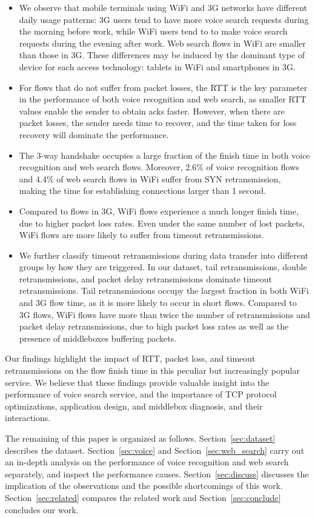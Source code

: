 \begin{itemize}
\item We observe that mobile terminals using WiFi and 3G networks have different daily usage patterns: 3G users tend to have more voice search requests during the morning before work, while WiFi users tend to to make voice search requests during the evening after work. Web search flows in WiFi are smaller than those in 3G. These differences may be induced by the dominant type of device for each access technology: tablets in WiFi and smartphones in 3G.
\item For flows that do not suffer from packet losses, the RTT is the key parameter in the performance of both voice recognition and web search, as smaller RTT values enable the sender to obtain acks faster. However, when there are packet losses, the sender needs time to recover, and the time taken for loss recovery will dominate the performance.
\item The 3-way handshake occupies a large fraction of the finish time in both voice recognition and web search flows. Moreover, 2.6\% of voice recognition flows and 4.4\% of web search flows in WiFi suffer from SYN retransmission, making the time for establishing connections larger than 1 second.
\item Compared to flows in 3G, WiFi flows experience a much longer finish time, due to higher packet loss rates. Even under the same number of lost packets, WiFi flows are more likely to suffer from timeout retransmissions.
\item We further classify timeout retransmissions during data transfer into different groups by how they are triggered. In our dataset, tail retransmissions, double retransmissions, and packet delay retransmissions dominate timeout retransmissions. Tail retransmissions occupy the largest fraction in both WiFi and 3G flow time, as it is more likely to occur in short flows. Compared to 3G flows, WiFi flows have more than twice the number of retransmissions and packet delay retransmissions, due to high packet loss rates as well as the presence of middleboxes buffering packets.
\end{itemize}

Our findings highlight the impact of RTT, packet loss, and timeout retransmissions on the flow finish time in this peculiar but increasingly popular service. We believe that these findings provide valuable insight into the performance of voice search service, and the importance of TCP protocol optimizations, application design, and middlebox diagnosis, and their interactions.

The remaining of this paper is organized as follows. Section~\ref{sec:dataset} describes the dataset. Section~\ref{sec:voice} and Section~\ref{sec:web_search} carry out an in-depth analysis on the performance of voice recognition and web search separately, and inspect the performance causes. Section~\ref{sec:discuss} discusses the implication of the observations and the possible shortcomings of this work. Section~\ref{sec:related} compares the related work and Section~\ref{sec:conclude} concludes our work. 